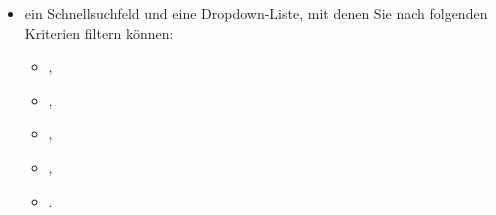 \begin{itemize}
\begin{itemize}
	\end{itemize}
	\Note{}: Die Suche erfolgt ohne Berücksichtigung der Groß-/Kleinschreibung und muss mindestens drei (3) alphanumerische Zeichen enthalten; es werden nur die übereinstimmenden Vorgänge in der Vorgangsliste angezeigt. Die Suche wird AUSSCHLIESSLICH auf die angezeigten Vorgänge angewendet (beachten Sie, ob die  angezeigt werden) und umfasst nicht die Archive.
	
	
	\item ein Schnellsuchfeld und eine Dropdown-Liste, mit denen Sie nach folgenden Kriterien filtern können:
		\begin{itemize} 
			\item {},
			\item {},
			\item {},
			\item {},
			\item {}.
		\end{itemize}
\end{itemize}


